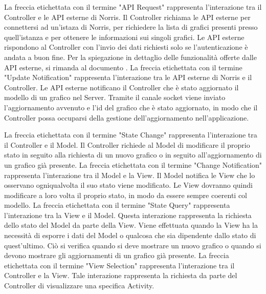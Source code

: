 	    La freccia etichettata con il termine "API Request" rappresenta l'interazione tra il Controller e le API esterne di Norris. Il Controller richiama le API esterne per connettersi ad un'istaza di Norris, per richiedere la lista di grafici presenti presso quell'istanza e per ottenere le informazioni sui singoli grafici. Le API esterne rispondono al Controller con l'invio dei dati richiesti solo se l'autenticazione è andata a buon fine. Per la spiegazione in dettaglio delle funzionalità offerte dalle API esterne, si rimanda al documento .
	   	La freccia etichettata con il termine "Update Notification" rappresenta l'interazione tra le API esterne di Norris e il Controller. Le API esterne notificano il Controller che è stato aggiornato il modello di un grafico nel Server. Tramite il canale socket viene inviato l'aggiornamento avvenuto e l'id del grafico che è stato aggiornato, in modo che il Controller possa occuparsi della gestione dell'aggiornamento nell'applicazione.
	    	
	    La freccia etichettata con il termine "State Change" rappresenta l'interazione tra il Controller e il Model. Il Controller richiede al Model di modificare il proprio stato in seguito alla richiesta di un nuovo grafico o in seguito all'aggiornamento di un grafico già presente.
	   	La freccia etichettata con il termine "Change Notification" rappresenta l'interazione tra il Model e la View. Il Model notifica le View che lo osservano ogniqualvolta il suo stato viene modificato. Le View dovranno quindi modificare a loro volta il proprio stato, in modo da essere sempre coerenti col modello.
	   	La freccia etichettata con il termine "State Query" rappresenta l'interazione tra la View e il Model. Questa interazione rappresenta la richiesta dello stato del Model da parte della View. Viene effettuata quando la View ha la necessità di esporre i dati del Model o qualcosa che sia dipendente dallo stato di quest'ultimo. Ciò si verifica quando si deve mostrare un nuovo grafico o quando si devono mostrare gli aggiornamenti di un grafico già presente.
	   	La freccia etichettata con il termine "View Selection" rappresenta l'interazione tra il Controller e la View. Tale interazione rappresenta la richiesta da parte del Controller di visualizzare una specifica Activity.

